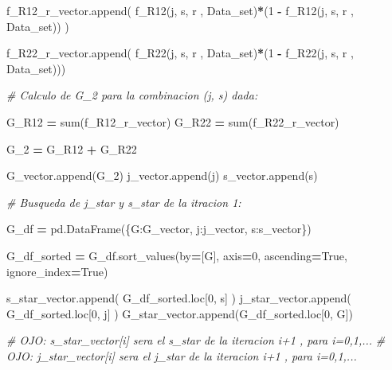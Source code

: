 \documentclass[
  11pt,
  a4paper,
]{article}
\newenvironment{Shaded}{\begin{snugshade}}{\end{snugshade}}
\newcommand{\BuiltInTok}[1]{#1}
\newcommand{\CommentTok}[1]{\textcolor[rgb]{0.56,0.35,0.01}{\textit{#1}}}
\newcommand{\DecValTok}[1]{\textcolor[rgb]{0.00,0.00,0.81}{#1}}
\newcommand{\NormalTok}[1]{#1}
\newcommand{\OperatorTok}[1]{\textcolor[rgb]{0.81,0.36,0.00}{\textbf{#1}}}
\newcommand{\StringTok}[1]{\textcolor[rgb]{0.31,0.60,0.02}{#1}}
\newcommand{\VariableTok}[1]{\textcolor[rgb]{0.00,0.00,0.00}{#1}}
\begin{document}
\begin{Shaded}
\begin{Highlighting}[]
\NormalTok{                    f\_R12\_r\_vector.append( f\_R12(j, s, r , Data\_set)}\OperatorTok{*}\NormalTok{(}\DecValTok{1} \OperatorTok{{-}}\NormalTok{ f\_R12(j, s, r , Data\_set)) )}

\NormalTok{                    f\_R22\_r\_vector.append( f\_R22(j, s, r , Data\_set)}\OperatorTok{*}\NormalTok{(}\DecValTok{1} \OperatorTok{{-}}\NormalTok{ f\_R22(j, s, r , Data\_set)))}


            \CommentTok{\# Calculo de G\_2 para la combinacion (j, s) dada:}

\NormalTok{                G\_R12 }\OperatorTok{=}  \BuiltInTok{sum}\NormalTok{(f\_R12\_r\_vector)}
\NormalTok{                G\_R22 }\OperatorTok{=}  \BuiltInTok{sum}\NormalTok{(f\_R22\_r\_vector)}

\NormalTok{                G\_2 }\OperatorTok{=}\NormalTok{  G\_R12 }\OperatorTok{+}\NormalTok{ G\_R22}

\NormalTok{                G\_vector.append(G\_2)}
\NormalTok{                j\_vector.append(j)}
\NormalTok{                s\_vector.append(s)}



        \CommentTok{\# Busqueda de j\_star y s\_star de la itracion 1:}

\NormalTok{        G\_df }\OperatorTok{=}\NormalTok{ pd.DataFrame(\{}\StringTok{\textquotesingle{}G\textquotesingle{}}\NormalTok{:G\_vector, }\StringTok{\textquotesingle{}j\textquotesingle{}}\NormalTok{:j\_vector, }\StringTok{\textquotesingle{}s\textquotesingle{}}\NormalTok{:s\_vector\})}

\NormalTok{        G\_df\_sorted }\OperatorTok{=}\NormalTok{ G\_df.sort\_values(by}\OperatorTok{=}\NormalTok{[}\StringTok{\textquotesingle{}G\textquotesingle{}}\NormalTok{], axis}\OperatorTok{=}\DecValTok{0}\NormalTok{, ascending}\OperatorTok{=}\VariableTok{True}\NormalTok{, ignore\_index}\OperatorTok{=}\VariableTok{True}\NormalTok{)}

\NormalTok{        s\_star\_vector.append( G\_df\_sorted.loc[}\DecValTok{0}\NormalTok{, }\StringTok{\textquotesingle{}s\textquotesingle{}}\NormalTok{] )}
\NormalTok{        j\_star\_vector.append( G\_df\_sorted.loc[}\DecValTok{0}\NormalTok{, }\StringTok{\textquotesingle{}j\textquotesingle{}}\NormalTok{] )}
\NormalTok{        G\_star\_vector.append(G\_df\_sorted.loc[}\DecValTok{0}\NormalTok{, }\StringTok{\textquotesingle{}G\textquotesingle{}}\NormalTok{])}


        \CommentTok{\# OJO: s\_star\_vector[i] sera el s\_star de la iteracion i+1 , para i=0,1,...}
        \CommentTok{\# OJO: j\_star\_vector[i] sera el j\_star de la iteracion i+1 , para i=0,1,... }



\end{Highlighting}
\end{Shaded}
\end{document}
